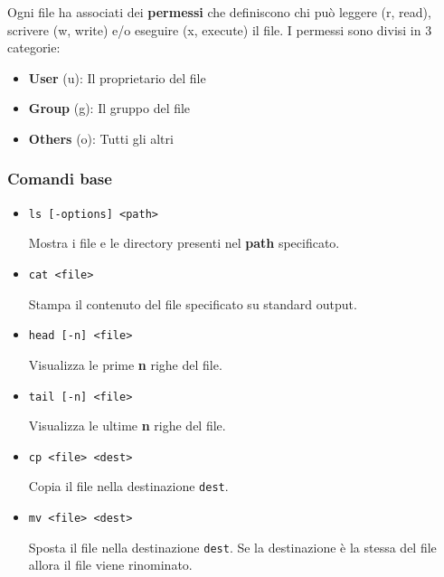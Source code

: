 \documentclass[a4paper]{article}
\begin{document}
\vspace{1em}
\noindent
Ogni file ha associati dei \textbf{permessi} che definiscono chi può leggere (r, read),
scrivere (w, write) e/o eseguire (x, execute) il file.
I permessi sono divisi in 3 categorie:
\begin{itemize}
  \item \textbf{User} (u): Il proprietario del file
  \item \textbf{Group} (g): Il gruppo del file
  \item \textbf{Others} (o): Tutti gli altri
\end{itemize}

\subsubsection{Comandi base}
\begin{itemize}
\item
\begin{lstlisting}
ls [-options] <path>
\end{lstlisting}
Mostra i file e le directory presenti nel \textbf{path} specificato.

\item
\begin{lstlisting}
cat <file>
\end{lstlisting}
Stampa il contenuto del file specificato su standard output.

\item
\begin{lstlisting}
head [-n] <file>
\end{lstlisting}
Visualizza le prime \textbf{n} righe del file.

\item
\begin{lstlisting}
tail [-n] <file>
\end{lstlisting}
Visualizza le ultime \textbf{n} righe del file.

\item
\begin{lstlisting}
cp <file> <dest>
\end{lstlisting}
Copia il file nella destinazione \texttt{dest}.

\item
\begin{lstlisting}
mv <file> <dest>
\end{lstlisting}
Sposta il file nella destinazione \texttt{dest}. Se la destinazione è la stessa del file
allora il file viene rinominato.


\end{itemize}
\end{document}

